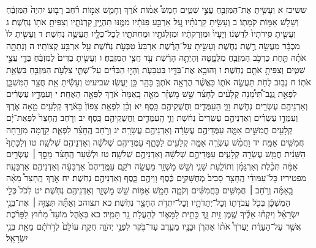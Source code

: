 \documentclass[twoside, openany, parskip=half, 11pt]{book}
\begin{document}
ששיכז א וְעָשִׂ֥יתָ אֶת־הַמִּזְבֵּ֖חַ עֲצֵ֣י שִׁטִּ֑ים חָמֵשׁ֩ אַמּ֨וֹת אֹ֜רֶךְ וְחָמֵ֧שׁ אַמּ֣וֹת רֹ֗חַב רָב֤וּעַ יִהְיֶה֙ הַמִּזְבֵּ֔חַ וְשָׁלֹ֥שׁ אַמּ֖וֹת קֹמָתֽוֹ׃ ב וְעָשִׂ֣יתָ קַרְנֹתָ֗יו עַ֚ל אַרְבַּ֣ע פִּנֹּתָ֔יו מִמֶּ֖נּוּ תִּהְיֶ֣יןָ קַרְנֹתָ֑יו וְצִפִּיתָ֥ אֹת֖וֹ נְחֹֽשֶׁת׃ ג וְעָשִׂ֤יתָ סִּֽירֹתָיו֙ לְדַשְּׁנ֔וֹ וְיָעָיו֙ וּמִזְרְקֹתָ֔יו וּמִזְלְגֹתָ֖יו וּמַחְתֹּתָ֑יו לְכׇל־כֵּלָ֖יו תַּעֲשֶׂ֥ה נְחֹֽשֶׁת׃ ד וְעָשִׂ֤יתָ לּוֹ֙ מִכְבָּ֔ר מַעֲשֵׂ֖ה רֶ֣שֶׁת נְחֹ֑שֶׁת וְעָשִׂ֣יתָ עַל־הָרֶ֗שֶׁת אַרְבַּע֙ טַבְּעֹ֣ת נְחֹ֔שֶׁת עַ֖ל אַרְבַּ֥ע קְצוֹתָֽיו׃ ה וְנָתַתָּ֣ה אֹתָ֗הּ תַּ֛חַת כַּרְכֹּ֥ב הַמִּזְבֵּ֖חַ מִלְּמָ֑טָּה וְהָיְתָ֣ה הָרֶ֔שֶׁת עַ֖ד חֲצִ֥י הַמִּזְבֵּֽחַ׃ ו וְעָשִׂ֤יתָ בַדִּים֙ לַמִּזְבֵּ֔חַ בַּדֵּ֖י עֲצֵ֣י שִׁטִּ֑ים וְצִפִּיתָ֥ אֹתָ֖ם נְחֹֽשֶׁת׃ ז וְהוּבָ֥א אֶת־בַּדָּ֖יו בַּטַּבָּעֹ֑ת וְהָי֣וּ הַבַּדִּ֗ים עַל־שְׁתֵּ֛י צַלְעֹ֥ת הַמִּזְבֵּ֖חַ בִּשְׂאֵ֥ת אֹתֽוֹ׃ ח נְב֥וּב לֻחֹ֖ת תַּעֲשֶׂ֣ה אֹת֑וֹ כַּאֲשֶׁ֨ר הֶרְאָ֥ה אֹתְךָ֛ בָּהָ֖ר כֵּ֥ן יַעֲשֽׂוּ׃
שביעיט וְעָשִׂ֕יתָ אֵ֖ת חֲצַ֣ר הַמִּשְׁכָּ֑ן לִפְאַ֣ת נֶֽגֶב־תֵּ֠ימָ֠נָה קְלָעִ֨ים לֶחָצֵ֜ר שֵׁ֣שׁ מׇשְׁזָ֗ר מֵאָ֤ה בָֽאַמָּה֙ אֹ֔רֶךְ לַפֵּאָ֖ה הָאֶחָֽת׃ י וְעַמֻּדָ֣יו עֶשְׂרִ֔ים וְאַדְנֵיהֶ֥ם עֶשְׂרִ֖ים נְחֹ֑שֶׁת וָוֵ֧י הָעַמֻּדִ֛ים וַחֲשֻׁקֵיהֶ֖ם כָּֽסֶף׃ יא וְכֵ֨ן לִפְאַ֤ת צָפוֹן֙ בָּאֹ֔רֶךְ קְלָעִ֖ים מֵ֣אָה אֹ֑רֶךְ וְעַמֻּדָ֣ו עֶשְׂרִ֗ים וְאַדְנֵיהֶ֤ם עֶשְׂרִים֙ נְחֹ֔שֶׁת וָוֵ֧י הָֽעַמֻּדִ֛ים וַחֲשֻׁקֵיהֶ֖ם כָּֽסֶף׃ יב וְרֹ֤חַב הֶֽחָצֵר֙ לִפְאַת־יָ֔ם קְלָעִ֖ים חֲמִשִּׁ֣ים אַמָּ֑ה עַמֻּדֵיהֶ֣ם עֲשָׂרָ֔ה וְאַדְנֵיהֶ֖ם עֲשָׂרָֽה׃ יג וְרֹ֣חַב הֶֽחָצֵ֗ר לִפְאַ֛ת קֵ֥דְמָה מִזְרָ֖חָה חֲמִשִּׁ֥ים אַמָּֽה׃ יד וַחֲמֵ֨שׁ עֶשְׂרֵ֥ה אַמָּ֛ה קְלָעִ֖ים לַכָּתֵ֑ף עַמֻּדֵיהֶ֣ם שְׁלֹשָׁ֔ה וְאַדְנֵיהֶ֖ם שְׁלֹשָֽׁה׃ טו וְלַכָּתֵף֙ הַשֵּׁנִ֔ית חֲמֵ֥שׁ עֶשְׂרֵ֖ה קְלָעִ֑ים עַמֻּדֵיהֶ֣ם שְׁלֹשָׁ֔ה וְאַדְנֵיהֶ֖ם שְׁלֹשָֽׁה׃ טז וּלְשַׁ֨עַר הֶֽחָצֵ֜ר מָסָ֣ךְ ׀ עֶשְׂרִ֣ים אַמָּ֗ה תְּכֵ֨לֶת וְאַרְגָּמָ֜ן וְתוֹלַ֧עַת שָׁנִ֛י וְשֵׁ֥שׁ מׇשְׁזָ֖ר מַעֲשֵׂ֣ה רֹקֵ֑ם עַמֻּֽדֵיהֶם֙ אַרְבָּעָ֔ה וְאַדְנֵיהֶ֖ם אַרְבָּעָֽה׃ מפטיריז כׇּל־עַמּוּדֵ֨י הֶֽחָצֵ֤ר סָבִיב֙ מְחֻשָּׁקִ֣ים כֶּ֔סֶף וָוֵיהֶ֖ם כָּ֑סֶף וְאַדְנֵיהֶ֖ם נְחֹֽשֶׁת׃ יח אֹ֣רֶךְ הֶֽחָצֵר֩ מֵאָ֨ה בָֽאַמָּ֜ה וְרֹ֣חַב ׀ חֲמִשִּׁ֣ים בַּחֲמִשִּׁ֗ים וְקֹמָ֛ה חָמֵ֥שׁ אַמּ֖וֹת שֵׁ֣שׁ מׇשְׁזָ֑ר וְאַדְנֵיהֶ֖ם נְחֹֽשֶׁת׃ יט לְכֹל֙ כְּלֵ֣י הַמִּשְׁכָּ֔ן בְּכֹ֖ל עֲבֹדָת֑וֹ וְכׇל־יְתֵדֹתָ֛יו וְכׇל־יִתְדֹ֥ת הֶחָצֵ֖ר נְחֹֽשֶׁת׃
כא תצוהכ וְאַתָּ֞ה תְּצַוֶּ֣ה ׀ אֶת־בְּנֵ֣י יִשְׂרָאֵ֗ל וְיִקְח֨וּ אֵלֶ֜יךָ שֶׁ֣מֶן זַ֥יִת זָ֛ךְ כָּתִ֖ית לַמָּא֑וֹר לְהַעֲלֹ֥ת נֵ֖ר תָּמִֽיד׃ כא בְּאֹ֣הֶל מוֹעֵד֩ מִח֨וּץ לַפָּרֹ֜כֶת אֲשֶׁ֣ר עַל־הָעֵדֻ֗ת יַעֲרֹךְ֩ אֹת֨וֹ אַהֲרֹ֧ן וּבָנָ֛יו מֵעֶ֥רֶב עַד־בֹּ֖קֶר לִפְנֵ֣י יְהֹוָ֑ה חֻקַּ֤ת עוֹלָם֙ לְדֹ֣רֹתָ֔ם מֵאֵ֖ת בְּנֵ֥י יִשְׂרָאֵֽל׃
\end{document}
